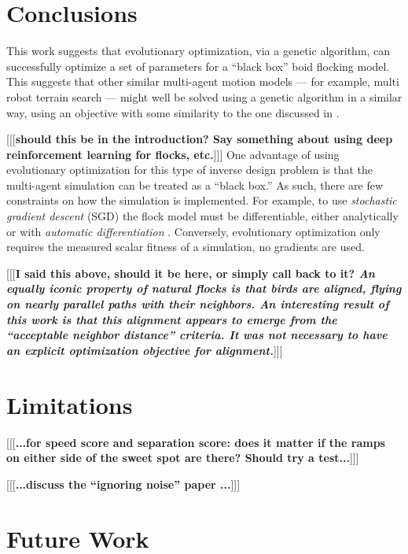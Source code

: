 \documentclass[letterpaper]{article}
\begin{document}
\section{Conclusions}
\label{sec:Conclusions}

This work suggests that evolutionary optimization, via a genetic algorithm, can successfully optimize a set of parameters for a ``black box'' boid flocking model. This suggests that other similar multi-agent motion models --- for example, multi robot terrain search --- might well be solved using a genetic algorithm in a similar way, using an objective with some similarity to the one discussed in .

[[[\textbf{should this be in the introduction? Say something about using deep reinforcement learning for flocks, etc.}]]] One advantage of using evolutionary optimization for this type of inverse design problem is that the multi-agent simulation can be treated as a ``black box.'' As such, there are few constraints on how the simulation is implemented. For example, to use \textit{stochastic gradient descent} (SGD) \citep{robbins_stochastic_1951} the flock model must be differentiable, either analytically or with \textit{automatic differentiation} \citep{baydin_automatic_2018}. Conversely, evolutionary optimization only requires the measured scalar fitness of a simulation, no gradients are used.

[[[\textbf{I said this above, should it be here, or simply call back to it? \textit{An equally iconic property of natural flocks is that birds are aligned, flying on nearly parallel paths with their neighbors. An interesting result of this work is that this alignment appears to \textit{emerge} from the ``acceptable neighbor distance'' criteria. It was \textbf{not} necessary to have an explicit optimization objective for alignment.}}]]]

\section{Limitations}
\label{sec:limitations}

[[[\textbf{...for speed score and separation score: does it matter if the ramps on either side of the sweet spot are there? Should try a test...}]]]

[[[\textbf{...discuss the ``ignoring noise'' paper \citep{antipov_evolutionary_2025}...}]]]

\section{Future Work}
\label{sec:future}
\end{document}
